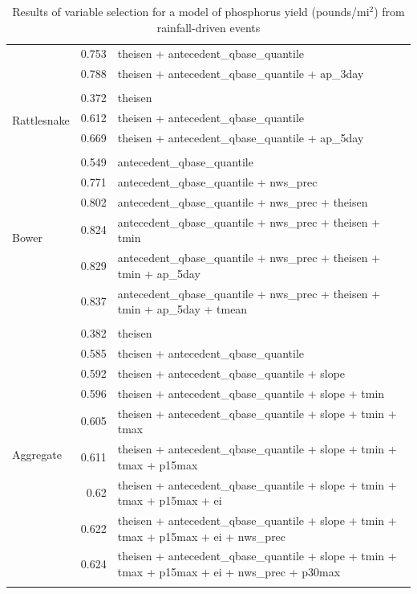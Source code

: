 \documentclass[10pt]{article}
\begin{document}
\begin{table}[h]
\begin{center}
\begin{tabular}{lrl}
 & 0.753 & theisen + antecedent\_qbase\_quantile\\ 
 & 0.788 & theisen + antecedent\_qbase\_quantile + ap\_3day\\ 
\vspace{2mm}\\ \multirow{4}{*}{Rattlesnake} & 0.372 & theisen\\ 
 & 0.612 & theisen + antecedent\_qbase\_quantile\\ 
 & 0.669 & theisen + antecedent\_qbase\_quantile + ap\_5day\\ 
\vspace{2mm}\\ \multirow{7}{*}{Bower} & 0.549 & antecedent\_qbase\_quantile\\ 
 & 0.771 & antecedent\_qbase\_quantile + nws\_prec\\ 
 & 0.802 & antecedent\_qbase\_quantile + nws\_prec + theisen\\ 
 & 0.824 & antecedent\_qbase\_quantile + nws\_prec + theisen + tmin\\ 
 & 0.829 & antecedent\_qbase\_quantile + nws\_prec + theisen + tmin + ap\_5day\\ 
 & 0.837 & antecedent\_qbase\_quantile + nws\_prec + theisen + tmin + ap\_5day + tmean\\ 
\vspace{2mm}\\ \multirow{10}{*}{Aggregate} & 0.382 & theisen\\ 
 & 0.585 & theisen + antecedent\_qbase\_quantile\\ 
 & 0.592 & theisen + antecedent\_qbase\_quantile + slope\\ 
 & 0.596 & theisen + antecedent\_qbase\_quantile + slope + tmin\\ 
 & 0.605 & theisen + antecedent\_qbase\_quantile + slope + tmin + tmax\\ 
 & 0.611 & theisen + antecedent\_qbase\_quantile + slope + tmin + tmax + p15max\\ 
 & 0.62 & theisen + antecedent\_qbase\_quantile + slope + tmin + tmax + p15max + ei\\ 
 & 0.622 & theisen + antecedent\_qbase\_quantile + slope + tmin + tmax + p15max + ei + nws\_prec\\ 
 & 0.624 & theisen + antecedent\_qbase\_quantile + slope + tmin + tmax + p15max + ei + nws\_prec + p30max\\ 
\vspace{2mm}\\     \end{tabular}
    \caption{Results of variable selection for a model of phosphorus yield (pounds/$\text{mi}^2$) from rainfall-driven events\label{phos_r_square_nosnow}}
    \end{center}
\end{table}
\end{document}
